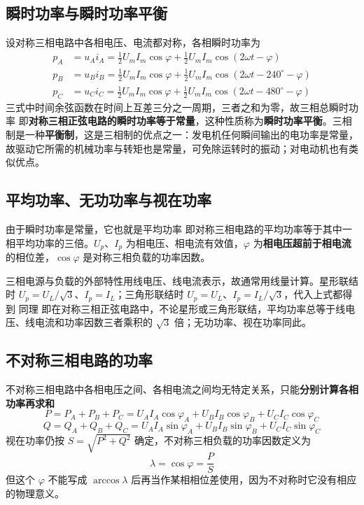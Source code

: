 \subsection{瞬时功率与瞬时功率平衡}
设对称三相电路中各相电压、电流都对称，各相瞬时功率为
\begin{equation}
\begin{aligned}
p_A&=u_Ai_A=\frac{1}{2}U_mI_m\cos\varphi+\frac{1}{2}U_mI_m\cos\left(2\omega t-\varphi\right)\\
p_B&=u_Bi_B=\frac{1}{2}U_mI_m\cos\varphi+\frac{1}{2}U_mI_m\cos\left(2\omega t-240^\circ-\varphi\right)\\
p_C&=u_Ci_C=\frac{1}{2}U_mI_m\cos\varphi+\frac{1}{2}U_mI_m\cos\left(2\omega t-480^\circ-\varphi\right)
\end{aligned}
\end{equation}
三式中时间余弦函数在时间上互差三分之一周期，三者之和为零，故三相总瞬时功率
即\textbf{对称三相正弦电路的瞬时功率等于常量}，这种性质称为\textbf{瞬时功率平衡}。三相制是一种\textbf{平衡制}，这是三相制的优点之一：发电机任何瞬间输出的电功率是常量，故驱动它所需的机械功率与转矩也是常量，可免除运转时的振动；对电动机也有类似优点。

\subsection{平均功率、无功功率与视在功率}
由于瞬时功率是常量，它也就是平均功率
即对称三相电路的平均功率等于其中一相平均功率的三倍。$U_p$、$I_p$ 为相电压、相电流有效值，$\varphi$ 为\textbf{相电压超前于相电流}的相位差，$\cos\varphi$ 是对称三相负载的功率因数。

三相电源与负载的外部特性用线电压、线电流表示，故通常用线量计算。星形联结时 $U_p=U_L/\sqrt{3}$、$I_p=I_L$；三角形联结时 $U_p=U_L$、$I_p=I_L/\sqrt{3}$，代入上式都得到
同理
即在对称三相正弦电路中，不论星形或三角形联结，平均功率总等于线电压、线电流和功率因数三者乘积的 $\sqrt{3}$ 倍；无功功率、视在功率同此。

\subsection{不对称三相电路的功率}
不对称三相电路中各相电压之间、各相电流之间均无特定关系，只能\textbf{分别计算各相功率再求和}
\begin{equation}
P=P_A+P_B+P_C=U_AI_A\cos\varphi_A+U_BI_B\cos\varphi_B+U_CI_C\cos\varphi_C
\end{equation}
\begin{equation}
Q=Q_A+Q_B+Q_C=U_AI_A\sin\varphi_A+U_BI_B\sin\varphi_B+U_CI_C\sin\varphi_C
\end{equation}
视在功率仍按 $S=\sqrt{P^2+Q^2}$ 确定，不对称三相负载的功率因数定义为
\begin{equation}
\lambda=\cos\varphi=\frac{P}{S}
\end{equation}
但这个 $\varphi$ 不能写成 $\arccos\lambda$ 后再当作某相相位差使用，因为不对称时它没有相应的物理意义。

